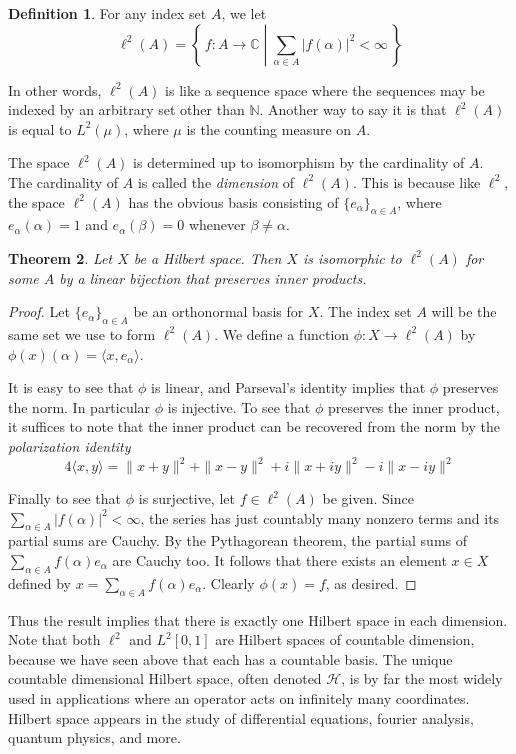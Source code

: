 \documentclass[11pt,oneside]{amsbook}
\newcommand{\set}[1]{\left\{\,#1\,\right\}}
\newcommand{\NN}{{\mathbb N}}
\newcommand{\CC}{{\mathbb C}}
\theoremstyle{definition}
\theoremstyle{plain}
\newtheorem{thm}{Theorem}[section]
\theoremstyle{definition}
\newtheorem{defn}[thm]{Definition}
\theoremstyle{remark}
\numberwithin{equation}{section}
\numberwithin{figure}{section}
\begin{document}
\begin{defn}
  For any index set $A$, we let
  \[\ell^2(A)=\set{f\colon A\to\CC\;\left|\;\sum_{\alpha\in A}|f(\alpha)|^2<\infty\right.}
  \]
\end{defn}

In other words, $\ell^2(A)$ is like a sequence space where the sequences may be indexed by an arbitrary set other than $\NN$. Another way to say it is that $\ell^2(A)$ is equal to $L^2(\mu)$, where $\mu$ is the counting measure on $A$.

The space $\ell^2(A)$ is determined up to isomorphism by the cardinality of $A$. The cardinality of $A$ is called the \emph{dimension} of $\ell^2(A)$. This is because like $\ell^2$, the space $\ell^2(A)$ has the obvious basis consisting of $\{e_\alpha\}_{\alpha\in A}$, where $e_\alpha(\alpha)=1$ and $e_\alpha(\beta)=0$ whenever $\beta\neq\alpha$.

\begin{thm}
  Let $X$ be a Hilbert space. Then $X$ is isomorphic to $\ell^2(A)$ for some $A$ by a linear bijection that preserves inner products.
\end{thm}

\begin{proof}
  Let $\{e_\alpha\}_{\alpha\in A}$ be an orthonormal basis for $X$. The index set $A$ will be the same set we use to form $\ell^2(A)$. We define a function $\phi\colon X\to\ell^2(A)$ by $\phi(x)(\alpha)=\langle x,e_\alpha\rangle$.

  It is easy to see that $\phi$ is linear, and Parseval's identity implies that $\phi$ preserves the norm. In particular $\phi$ is injective. To see that $\phi$ preserves the inner product, it suffices to note that the inner product can be recovered from the norm by the \emph{polarization identity}
  \[4\langle x,y\rangle=\|x+y\|^2+\|x-y\|^2+i\|x+iy\|^2-i\|x-iy\|^2
  \]

  Finally to see that $\phi$ is surjective, let $f\in\ell^2(A)$ be given. Since $\sum_{\alpha\in A}|f(\alpha)|^2<\infty$, the series has just countably many nonzero terms and its partial sums are Cauchy. By the Pythagorean theorem, the partial sums of $\sum_{\alpha\in A}f(\alpha)e_\alpha$ are Cauchy too. It follows that there exists an element $x\in X$ defined by $x=\sum_{\alpha\in A}f(\alpha)e_\alpha$. Clearly $\phi(x)=f$, as desired.
\end{proof}

Thus the result implies that there is exactly one Hilbert space in each dimension. Note that both $\ell^2$ and $L^2[0,1]$ are Hilbert spaces of countable dimension, because we have seen above that each has a countable basis. The unique countable dimensional Hilbert space, often denoted $\mathcal H$, is by far the most widely used in applications where an operator acts on infinitely many coordinates. Hilbert space appears in the study of differential equations, fourier analysis, quantum physics, and more.


\end{document}
